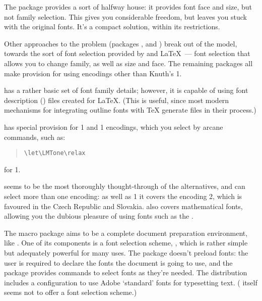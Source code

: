 The  package provides a sort of halfway house:
it provides font face and size, but not family selection.  This gives
you considerable freedom, but leaves you stuck with the original
 fonts.  It's a compact solution, within its restrictions.

Other \plaintex{} approaches to the problem (packages
,  and ) break out of the
\plaintex{} model, towards the sort of font selection provided by
\CONTeXT{} and \LaTeX{}~--- font selection that allows you to change
family, as well as size and face.  The remaining packages all make
provision for using encodings other than Knuth's 1.

 has a rather basic set of font family details;
however, it is capable of using font description () files
created for \LaTeX{}.  (This is useful, since most modern mechanisms
for integrating outline fonts with \TeX{} generate  files
in their process.)

 has special provision for 1 and 1
encodings, which you select by arcane commands, such as:
\begin{quote}
\begin{verbatim}
\let\LMTone\relax

\end{verbatim}
\end{quote}
for 1.

 seems to be the most thoroughly thought-through of the
alternatives, and can select more than one encoding: as well as
1 it covers the encoding 2, which is favoured in the
Czech Republic and Slovakia.   also covers mathematical fonts,
allowing you the dubious pleasure of using fonts such as the %
.

The  \plaintex{} macro package aims to be a complete
document preparation environment, like .  One
of its components is a font selection scheme, , which
is rather simple but adequately powerful for many uses.  The package
doesn't preload fonts: the user is required to declare the fonts the
document is going to use, and the package provides commands to select
fonts as they're needed.  The distribution includes a configuration to
use Adobe `standard' fonts for typesetting text.  (\Eplain{} itself
seems not to offer a font selection scheme.)

